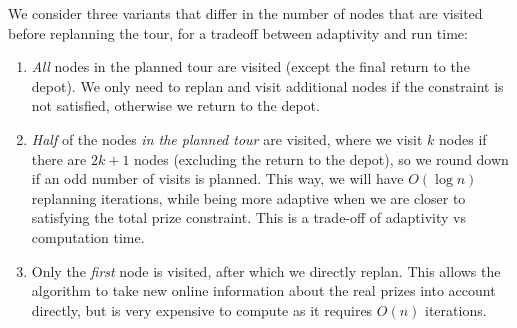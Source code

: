 We consider three variants that differ in the number of nodes that are visited before replanning the tour, for a tradeoff between adaptivity and run time:
\begin{enumerate}
    \item \emph{All} nodes in the planned tour are visited (except the final return to the depot). We only need to replan and visit additional nodes if the constraint is not satisfied, otherwise we return to the depot.
    \item \emph{Half} of the nodes \emph{in the planned tour} are visited, where we visit $k$ nodes if there are $2k + 1$ nodes (excluding the return to the depot), so we round down if an odd number of visits is planned. This way, we will have $O(\log n)$ replanning iterations, while being more adaptive when we are closer to satisfying the total prize constraint. This is a trade-off of adaptivity vs computation time.
    \item Only the \emph{first} node is visited, after which we directly replan. This allows the algorithm to take new online information about the real prizes into account directly, but is very expensive to compute as it requires $O(n)$ iterations.
\end{enumerate}
